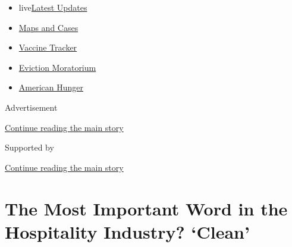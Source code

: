 \begin{itemize}
\tightlist
\item
  live\href{https://www.nytimes3xbfgragh.onion/2020/09/08/world/covid-19-coronavirus.html?name=styln-coronavirus-national\&region=TOP_BANNER\&block=storyline_menu_recirc\&action=click\&pgtype=Article\&impression_id=b0026621-f1c5-11ea-afae-53b463e59741\&variant=undefined}{Latest
  Updates}
\item
  \href{https://www.nytimes3xbfgragh.onion/interactive/2020/us/coronavirus-us-cases.html?name=styln-coronavirus-national\&region=TOP_BANNER\&block=storyline_menu_recirc\&action=click\&pgtype=Article\&impression_id=b0026622-f1c5-11ea-afae-53b463e59741\&variant=undefined}{Maps
  and Cases}
\item
  \href{https://www.nytimes3xbfgragh.onion/interactive/2020/science/coronavirus-vaccine-tracker.html?name=styln-coronavirus-national\&region=TOP_BANNER\&block=storyline_menu_recirc\&action=click\&pgtype=Article\&impression_id=b0026623-f1c5-11ea-afae-53b463e59741\&variant=undefined}{Vaccine
  Tracker}
\item
  \href{https://www.nytimes3xbfgragh.onion/2020/09/02/your-money/eviction-moratorium-covid.html?name=styln-coronavirus-national\&region=TOP_BANNER\&block=storyline_menu_recirc\&action=click\&pgtype=Article\&impression_id=b0026624-f1c5-11ea-afae-53b463e59741\&variant=undefined}{Eviction
  Moratorium}
\item
  \href{https://www.nytimes3xbfgragh.onion/interactive/2020/09/02/magazine/food-insecurity-hunger-us.html?name=styln-coronavirus-national\&region=TOP_BANNER\&block=storyline_menu_recirc\&action=click\&pgtype=Article\&impression_id=b0026625-f1c5-11ea-afae-53b463e59741\&variant=undefined}{American
  Hunger}
\end{itemize}

Advertisement

\protect\hyperlink{after-top}{Continue reading the main story}

Supported by

\protect\hyperlink{after-sponsor}{Continue reading the main story}

\hypertarget{the-most-important-word-in-the-hospitality-industry-clean}{%
\section{The Most Important Word in the Hospitality Industry?
`Clean'}\label{the-most-important-word-in-the-hospitality-industry-clean}}

